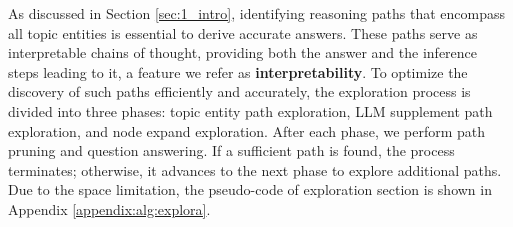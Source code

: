 As discussed in Section \ref{sec:1_intro}, identifying reasoning paths that encompass all topic entities is essential to derive accurate answers. These paths serve as interpretable chains of thought, providing both the answer and the inference steps leading to it, a feature we refer as \textbf{interpretability}.
To optimize the discovery of such paths efficiently and accurately, the exploration process is divided into three phases: topic entity path exploration, LLM supplement path exploration, and node expand exploration. After each phase, we perform path pruning and question answering. If a sufficient path is found, the process terminates; otherwise, it advances to the next phase to explore additional paths. 
Due to the space limitation, the pseudo-code of exploration section is shown in Appendix \ref{appendix:alg:explora}.





